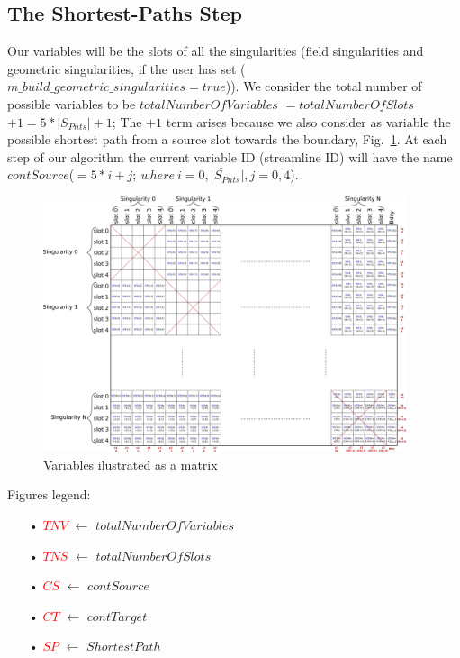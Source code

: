 \documentclass[a4paper]{report}
\begin{document}
{\subsection{The Shortest-Paths Step}{
Our variables will be the slots of all the singularities (field singularities and geometric singularities, if the user has set \newline(\textcolor{myGreen}{$m\_build\_geometric\_singularities = true$})). We consider the total number of possible variables to be \textcolor{myGreen}{$totalNumberOfVariables$} $=$\textcolor{myGreen}{$totalNumberOfSlots$}$ + 1 = 5 * |S_{Pnts}| + 1 $; The $+ 1$ term arises because we also consider as variable the possible shortest path from a source slot towards the boundary, Fig.~\ref{fig:SPVar}. At each step of our algorithm the current variable ID (streamline ID) will have the name \textcolor{myGreen}{$contSource$}($ = 5*i+j;\ where\ i=\overline{0,|S_{Pnts}|}, j=\overline{0,4}$).
\begin{figure}[h]
\includegraphics[width=0.95\textwidth]{ShortestPathsVariables}
\caption{Variables ilustrated as a matrix}
\label{fig:SPVar}
\end{figure}

Figures legend:
\begin{itemize}
\item[•] \textcolor{red}{$TNV$} $\leftarrow$ \textcolor{myGreen}{$totalNumberOfVariables$}
\item[•] \textcolor{red}{$TNS$} $\leftarrow$ \textcolor{myGreen}{$totalNumberOfSlots$}
\item[•] \textcolor{red}{$CS$} $\leftarrow$ \textcolor{myGreen}{$contSource$}
\item[•] \textcolor{red}{$CT$} $\leftarrow$ \textcolor{myGreen}{$contTarget$}
\item[•] \textcolor{red}{$SP$} $\leftarrow$ \textcolor{myGreen}{$Shortest Path$}
\end{itemize}



}}
\end{document}
